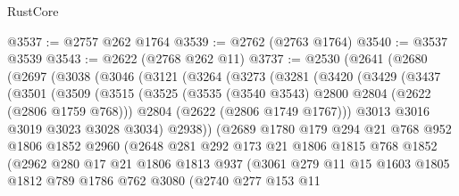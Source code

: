 \begin{lexlean}{RustCore}
\begin{coremodule}
@3537 := @2757 @262 @1764
@3539 := @2762 (@2763 @1764)
@3540 := @3537 @3539
@3543 := @2622 (@2768 @262 @11)
@3737 := @2530
    (@2641
      (@2680
        (@2697
          (@3038
            (@3046
              (@3121
                (@3264
                  (@3273
                    (@3281
                      (@3420
                        (@3429
                          (@3437
                            (@3501
                              (@3509
                                (@3515
                                  (@3525
                                    (@3535 (@3540 @3543) @2800 @2804 (@2622 (@2806 @1759 @768)))
                                    @2804
                                    (@2622 (@2806 @1749 @1767)))
                                  @3013
                                  @3016
                                  @3019
                                  @3023
                                  @3028
                                  @3034)
                                @2938))
                            (@2689
                              @1780
                              @179
                              @294
                              @21
                              @768
                              @952
                              @1806
                              @1852
                              @2960
                              (@2648
                                @281
                                @292
                                @173
                                @21
                                @1806
                                @1815
                                @768
                                @1852
                                (@2962
                                  @280
                                  @17
                                  @21
                                  @1806
                                  @1813
                                  @937
                                  (@3061
                                    @279
                                    @11
                                    @15
                                    @1603
                                    @1805
                                    @1812
                                    @789
                                    @1786
                                    @762
                                    @3080
                                    (@2740
                                      @277
                                      @153
                                      @11

\end{coremodule}
\end{lexlean}
